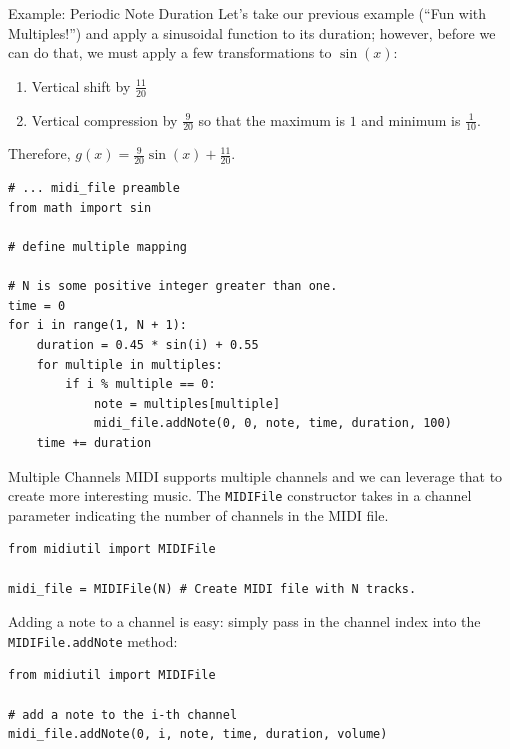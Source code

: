 \documentclass{beamer}
\begin{document}
\begin{frame}{Example: Periodic Note Duration}
Let's take our previous example (``Fun with Multiples!'') and apply a sinusoidal function to its duration; however, before we can do that, we must apply a few transformations to $\sin(x)$:
\begin{enumerate}
    \item Vertical shift by $\frac{11}{20}$
    \item Vertical compression by $\frac{9}{20}$ so that the maximum is $1$ and minimum is $\frac{1}{10}.$ 
\end{enumerate}
Therefore, $\displaystyle{g(x)=\frac{9}{20}\sin(x)+\frac{11}{20}.}$
\framebreak
\begin{center}
\begin{lstlisting}[language=iPython]
# ... midi_file preamble
from math import sin

# define multiple mapping

# N is some positive integer greater than one.
time = 0
for i in range(1, N + 1):
    duration = 0.45 * sin(i) + 0.55
    for multiple in multiples:
        if i % multiple == 0:
            note = multiples[multiple]
            midi_file.addNote(0, 0, note, time, duration, 100)
    time += duration
\end{lstlisting}
\end{center}
\end{frame}

\begin{frame}{Multiple Channels}
MIDI supports multiple channels and we can leverage that to create more interesting music. The \lstinline[language=iPython]{MIDIFile} constructor takes in a channel parameter indicating the number of channels in the MIDI file.
\begin{center}
\begin{lstlisting}[language=iPython]
from midiutil import MIDIFile

midi_file = MIDIFile(N) # Create MIDI file with N tracks.
\end{lstlisting}
\end{center}
\framebreak
Adding a note to a channel is easy: simply pass in the channel index into the \lstinline[language=iPython]{MIDIFile.addNote} method:
\begin{center}
\begin{lstlisting}[language=iPython]
from midiutil import MIDIFile

# add a note to the i-th channel
midi_file.addNote(0, i, note, time, duration, volume)
\end{lstlisting}
\end{center}
\end{frame}
\end{document}
